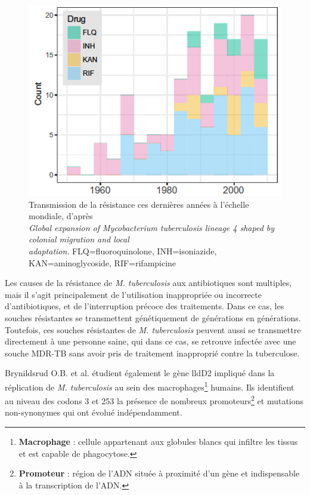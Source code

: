 \documentclass[twoside,a4paper,11pt,frenchb,openany]{report}
\begin{document}
\begin{figure}[h!]
\centering
\includegraphics[scale=0.6]{amr.png}
\caption{Transmission de la résistance ces dernières années à l'échelle mondiale, d'après\\ \textit{Global expansion of Mycobacterium tuberculosis lineage 4 shaped by colonial migration and local\\ adaptation}. FLQ=fluoroquinolone, INH=isoniazide, KAN=aminoglycoside, RIF=rifampicine}
\end{figure}

Les causes de la résistance de \textit{M. tuberculosis} aux antibiotiques sont multiples, mais il s'agit principalement de l'utilisation inappropriée ou incorrecte d'antibiotiques, et de l'interruption précoce des traitements. Dans ce cas, les souches résistantes se transmettent génétiquement de générations en générations. Toutefois, ces souches résistantes de \textit{M. tuberculosis} peuvent aussi se transmettre directement à une personne saine, qui dans ce cas, se retrouve infectée avec une souche MDR-TB sans avoir pris de traitement inapproprié contre la tuberculose.

Brynildsrud O.B. et al. étudient également le gène lldD2 impliqué dans la réplication de \textit{M. tuberculosis} au sein des macrophages\footnote{\textbf{Macrophage} : cellule appartenant aux globules blancs qui infiltre les tissus et est capable de phagocytose.} humains. Ils identifient au niveau des codons 3 et 253 la présence de nombreux promoteurs\footnote{\textbf{Promoteur} : région de l'ADN située à proximité d'un gène et indispensable à la transcription de l'ADN.} et mutations non-synonymes qui ont évolué indépendamment.
\end{document}
